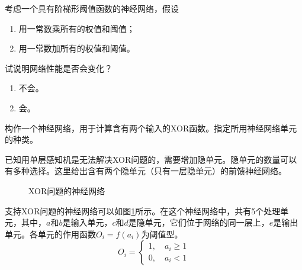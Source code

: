 \begin{question}
考虑一个具有阶梯形阈值函数的神经网络，假设
	\begin{enumerate}
		\item 用一常数乘所有的权值和阈值；
		\item 用一常数加所有的权值和阈值。
	\end{enumerate}
试说明网络性能是否会变化？
\end{question}
\begin{solution}
	\begin{enumerate}
		\item 不会。
		\item 会。
	\end{enumerate}
\end{solution}

\begin{question}
构作一个神经网络，用于计算含有两个输入的XOR函数。指定所用神经网络单元的种类。
\end{question}
\begin{solution}
已知用单层感知机是无法解决XOR问题的，需要增加隐单元。隐单元的数量可以有多种选择。这里给出含有两个隐单元（只有一层隐单元）的前馈神经网络。\par 
	\begin{figure}[h]
		\centering
		
		\caption{XOR问题的神经网络} \label{Fig:NN-XOR}
	\end{figure}
支持XOR问题的神经网络可以如图\ref{Fig:NN-XOR}所示。在这个神经网络中，共有5个处理单元，其中，$a$和$b$是输入单元，$c$和$d$是隐单元，它们位于网络的同一层上，$e$是输出单元。各单元的作用函数$O_i = f(a_i)$为阈值型。
\[O_i = \begin{cases}
	1, \quad a_i \geq 1 \\
	0, \quad a_i < 1
\end{cases} \]
\end{solution}

